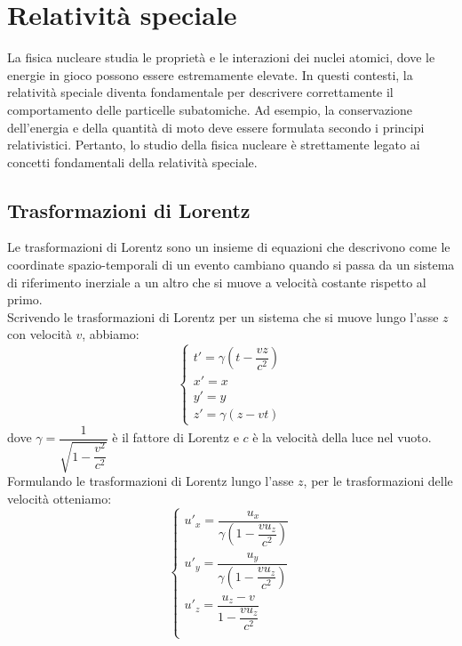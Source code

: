 \chapter{Relatività speciale}
La fisica nucleare studia le proprietà e le interazioni dei nuclei atomici, dove le energie in gioco possono essere estremamente elevate. In questi contesti, la relatività speciale diventa fondamentale per descrivere correttamente il comportamento delle particelle subatomiche. Ad esempio, la conservazione dell'energia e della quantità di moto deve essere formulata secondo i principi relativistici. Pertanto, lo studio della fisica nucleare è strettamente legato ai concetti fondamentali della relatività speciale.
\section{Trasformazioni di Lorentz}
Le trasformazioni di Lorentz sono un insieme di equazioni che descrivono come le coordinate spazio-temporali di un evento cambiano quando si passa da un sistema di riferimento inerziale a un altro che si muove a velocità costante rispetto al primo.\\
Scrivendo le trasformazioni di Lorentz per un sistema che si muove lungo l'asse $z$ con velocità $v$, abbiamo:
\begin{equation}
    \begin{cases}
        t' = \gamma \left( t - \dfrac{v z}{c^2} \right) \\
        x' = x \\
        y' = y \\
        z' = \gamma (z - v t)
    \end{cases}
\end{equation}
dove $\gamma = \dfrac{1}{\sqrt{1 - \dfrac{v^2}{c^2}}}$ è il fattore di Lorentz e $c$ è la velocità della luce nel vuoto.\\
Formulando le trasformazioni di Lorentz lungo l'asse $z$, per le trasformazioni delle velocità otteniamo:
\begin{equation}
    \begin{cases}
        u'_x = \dfrac{u_x}{\gamma \left( 1 - \dfrac{v u_z}{c^2} \right)} \\
        u'_y = \dfrac{u_y}{\gamma \left( 1 - \dfrac{v u_z}{c^2} \right)} \\
        u'_z = \dfrac{u_z - v}{1 - \dfrac{v u_z}{c^2}} \\
    \end{cases}
\end{equation}
